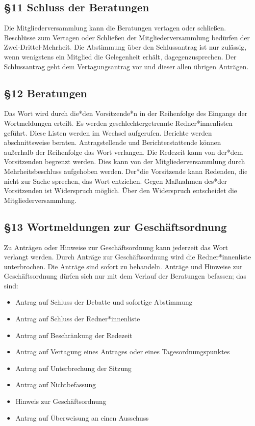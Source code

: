 \documentclass[12pt]{report}
\begin{document}
\begin{justify}
\subsection*{§11 Schluss der Beratungen}
Die Mitgliederversammlung kann die Beratungen vertagen oder schließen. Beschlüsse zum Vertagen oder
Schließen der Mitgliederversammlung bedürfen der Zwei-Drittel-Mehrheit. Die Abstimmung über den
Schlussantrag ist nur zulässig, wenn wenigstens ein Mitglied die Gelegenheit erhält, dagegenzusprechen.
Der Schlussantrag geht dem Vertagungsantrag vor und dieser allen übrigen Anträgen.
\subsection*{§12 Beratungen}
Das Wort wird durch die*den Vorsitzende*n in der Reihenfolge des Eingangs der Wortmeldungen erteilt.
Es werden geschlechtergetrennte Redner*innenlisten geführt. Diese Listen werden im Wechsel aufgerufen. Berichte werden
abschnittsweise beraten. Antragstellende und Berichterstattende können außerhalb der Reihenfolge das
Wort verlangen. Die Redezeit kann von der*dem Vorsitzenden begrenzt werden. Dies kann von der 
Mitgliederversammlung durch Mehrheitsbeschluss aufgehoben werden. Der*die Vorsitzende kann Redenden, die
nicht zur Sache sprechen, das Wort entziehen. Gegen Maßnahmen des*der Vorsitzenden ist Widerspruch
möglich. Über den Widerspruch entscheidet die Mitgliederversammlung.
\subsection*{§13 Wortmeldungen zur Geschäftsordnung}
Zu Anträgen oder Hinweise zur Geschäftsordnung kann jederzeit das Wort verlangt werden. Durch Anträge
zur Geschäftsordnung wird die Redner*innenliste unterbrochen. Die Anträge sind sofort zu behandeln. Anträge und
Hinweise zur Geschäftsordnung dürfen sich nur mit dem Verlauf der Beratungen befassen; das sind:

\begin{itemize}
  \item Antrag auf Schluss der Debatte und sofortige Abstimmung
  \item Antrag auf Schluss der Redner*innenliste
  \item Antrag auf Beschränkung der Redezeit
  \item Antrag auf Vertagung eines Antrages oder eines Tagesordnungspunktes
  \item Antrag auf Unterbrechung der Sitzung
  \item Antrag auf Nichtbefassung
  \item Hinweis zur Geschäftsordnung
  \item Antrag auf Überweisung an einen Ausschuss
\end{itemize}


\end{justify}
\end{document}
